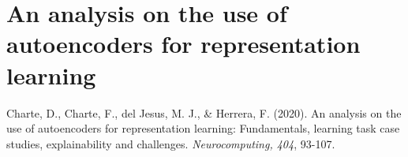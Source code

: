 \documentclass[
	fontsize=11pt, %
	twoside=false, %
	open=any, %
	secnumdepth=1, %
]{kaobook}
\begin{document}
  \renewcommand*{\thechapter}{\Roman{chapter}}
  \addtocounter{chapter}{4}
  \chapter{An analysis on the use of autoencoders for representation learning}
  
  \begin{widepar}
    \begin{kaobox}[frametitle=Source]
      Charte, D., Charte, F., del Jesus, M. J., \& Herrera, F. (2020). An analysis on the use of autoencoders for representation learning: Fundamentals, learning task case studies, explainability and challenges. \textit{Neurocomputing, 404}, 93-107.
  \end{kaobox}
  \end{widepar}






\end{document}
